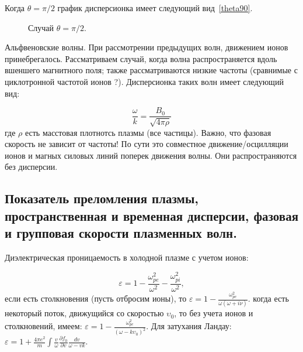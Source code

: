 \documentclass[10pt, a4paper]{article}
\begin{document}
Когда $\theta=\pi/2$ график дисперсионка имеет следующий вид~\ref{theta90}.
\begin{figure}[h!]
    \caption{\label{theta-90} Случай $\theta=\pi/2$.}
\end{figure}

Альфвеновские волны. При рассмотрении предыдущих волн, движением ионов принебрегалось. Рассматриваем случай, когда волна распространяется вдоль вшеншего магнитного поля; также рассматриваются низкие частоты (сравнимые с циклотронной частотой ионов ?). Дисперсионка таких волн имеет следующий вид:

\begin{equation}
    \label{alfven}
    \frac{\omega}{k}=\frac{B_0}{\sqrt{4\pi \rho}}
\end{equation}
где $\rho$ есть масстовая плотнотсь плазмы (все частицы). Важно, что фазовая скорость не зависит от частоты! По сути это совместное движение/осцилляции ионов и магных силовых линий поперек движения волны. Они распространяются без дисперсии.

\subsection{Показатель преломления плазмы, пространственная и временная дисперсии, фазовая и групповая скорости плазменных волн.}
\label{sec.7.2}


Диэлектрическая проницаемость в холодной плазме с учетом ионов:

\begin{equation}
    \label{eq.7.7}
    \varepsilon=1 - \frac{\omega_{pe}^2}{\omega^2} - \frac{\omega_{pi}^2}{\omega^2},
\end{equation}
если есть столкновения (пусть отбросим ионы), то $\varepsilon=1-\frac{\omega_{pe}^2}{\omega (\omega+i \nu)}$. когда есть некоторый поток, движущийся со скоростью $\upsilon_0$, то без учета ионов и столкновений, имеем: $\varepsilon=1-\frac{\omega_{pe}^2}{(\omega - k \upsilon_0)^2}$.
Для затухания Ландау: $\varepsilon=1+\frac{4\pi e^2}{m} \int \frac{v}{\omega} \frac{\partial f_0}{\partial v} \frac{dv}{\omega-vk}$.
\end{document}
